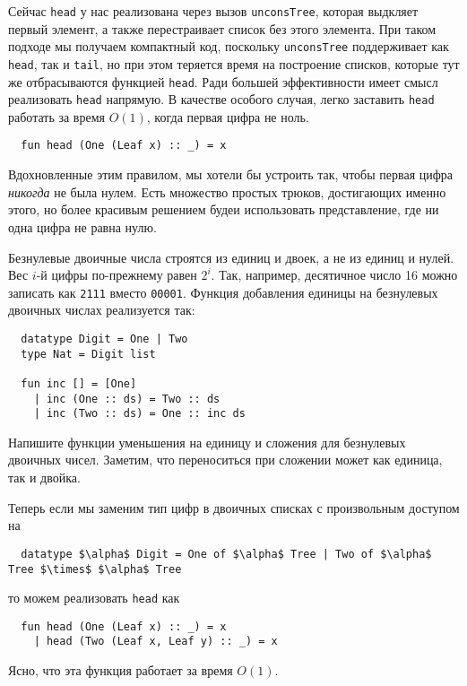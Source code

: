 Сейчас \lstinline!head! у нас реализована через вызов
\lstinline!unconsTree!, которая выдкляет первый элемент, а также
перестраивает список без этого элемента. При таком подходе мы получаем
компактный код, поскольку \lstinline!unconsTree! поддерживает как
\lstinline!head!, так и \lstinline!tail!, но при этом теряется время
на построение списков, которые тут же отбрасываются функцией
\lstinline!head!. Ради большей эффективности имеет смысл реализовать
\lstinline!head! напрямую. В качестве особого случая, легко заставить
\lstinline!head! работать за время $O(1)$, когда первая цифра не ноль.
\begin{lstlisting}
  fun head (One (Leaf x) :: _) = x
\end{lstlisting}
Вдохновленные этим правилом, мы хотели бы устроить так, чтобы первая
цифра \emph{никогда} не была нулем. Есть множество простых трюков,
достигающих именно этого, но более красивым решением будеи
использовать  представление, где ни одна
цифра не равна нулю.

Безнулевые двоичные числа строятся из единиц и двоек, а не из единиц и
нулей. Вес $i$-й цифры по-прежнему равен $2^i$. Так, например,
десятичное число 16 можно записать как \texttt{2111} вместо
\texttt{00001}. Функция добавления единицы на безнулевых двоичных
числах реализуется так:
\begin{lstlisting}
  datatype Digit = One | Two
  type Nat = Digit list

  fun inc [] = [One]
    | inc (One :: ds) = Two :: ds
    | inc (Two :: ds) = One :: inc ds
\end{lstlisting}

\begin{exercise}\label{ex:9.4}
  Напишите функции уменьшения на единицу и сложения для безнулевых
  двоичных чисел. Заметим, что переноситься при сложении может как
  единица, так и двойка.
\end{exercise}

Теперь если мы заменим тип цифр в двоичных списках с произвольным
доступом на
\begin{lstlisting}
  datatype $\alpha$ Digit = One of $\alpha$ Tree | Two of $\alpha$ Tree $\times$ $\alpha$ Tree
\end{lstlisting}
то можем реализовать \lstinline!head! как
\begin{lstlisting}
  fun head (One (Leaf x) :: _) = x
    | head (Two (Leaf x, Leaf y) :: _) = x
\end{lstlisting}
Ясно, что эта функция работает за время $O(1)$.


